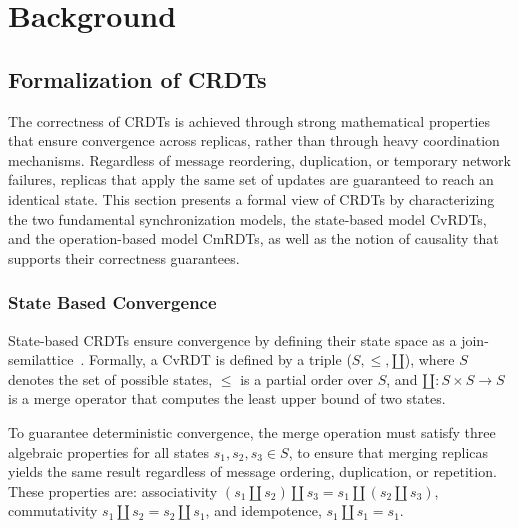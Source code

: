 
%

\makeatletter
\newcommand{\ntifpkgloaded}{%
  \@ifpackageloaded%
}
\makeatother


\chapter{Background}
\label{cha:background}

\section{Formalization of CRDTs}
\label{sec:document_structure}

The correctness of CRDTs is achieved through strong mathematical properties that ensure convergence across replicas, rather than through heavy coordination mechanisms. Regardless of message reordering, duplication, or temporary network failures, replicas that apply the same set of updates are guaranteed to reach an identical state. This section presents a formal view of CRDTs by characterizing the two fundamental synchronization models, the state-based model CvRDTs, and the operation-based model CmRDTs, as well as the notion of causality that supports their correctness guarantees.

\subsection{State Based Convergence}
\label{sub:state_convergence}

State-based CRDTs ensure convergence by defining their state space as a join-semilattice~\cite{shapiro2011comprehensive}. Formally, a CvRDT is defined by a triple ($S, \leq, \amalg$), where $S$ denotes the set of possible states, $\leq$ is a partial order over $S$, and $\amalg: S \times S \rightarrow S$ is a merge operator that computes the least upper bound of two states.

To guarantee deterministic convergence, the merge operation must satisfy three algebraic properties for all states $s_1, s_2, s_3 \in S$, to ensure that merging replicas yields the same result regardless of message ordering, duplication, or repetition. These properties are: associativity $(s_1 \amalg s_2) \amalg s_3 = s_1 \amalg (s_2 \amalg s_3)$, commutativity $s_1 \amalg s_2 = s_2 \amalg s_1$, and idempotence, $s_1 \amalg s_1 = s_1$.


